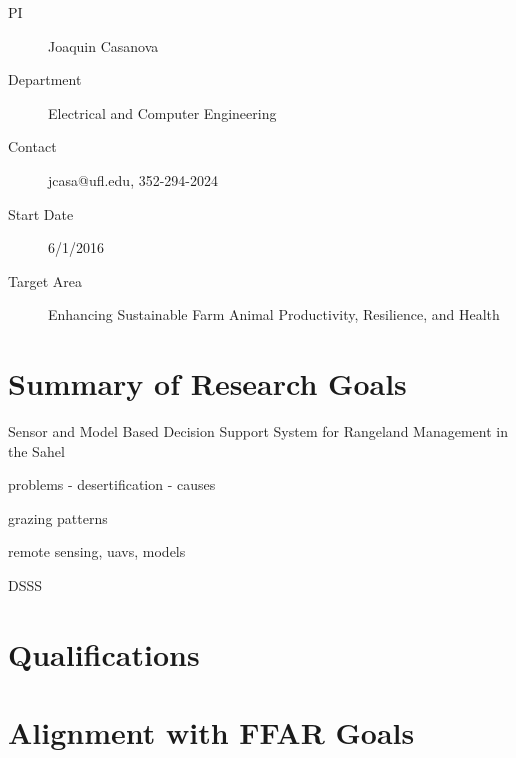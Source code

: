 \documentclass[11pt,letterpaper]{article}
\newcommand{\required}[1]{\section*{\hfil #1\hfil}}                    %
\begin{document}
\begin{description}
\item [PI] Joaquin Casanova
\item [Department] Electrical and Computer Engineering
\item [Contact] jcasa@ufl.edu, 352-294-2024
\item [Start Date] 6/1/2016
\item [Target Area] Enhancing Sustainable Farm Animal Productivity, Resilience, and Health
\end{description}
\required{Summary of Research Goals}

Sensor and Model Based Decision Support System for Rangeland Management in the Sahel

problems - desertification - causes

grazing patterns

remote sensing, uavs, models

DSSS

\required{Qualifications}

\required{Alignment with FFAR Goals}

\cite{darkoh1998nature}


\end{document}
